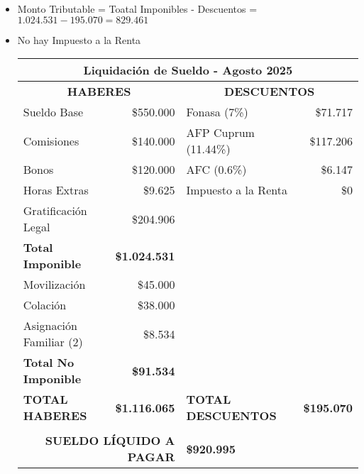\documentclass[11pt]{article}
\begin{document}
\begin{enumerate}
\begin{itemize}
        \item Monto Tributable = Toatal Imponibles - Descuentos = $1.024.531 - 195.070 = 829.461 $
        \item No hay Impuesto a la Renta
            \begin{center}
            \begin{tabular}{|| l | r || l | r ||}
                \hline
                \multicolumn{4}{||c||}{\textbf{Liquidación de Sueldo - Agosto 2025}} \\
                \hline
                \multicolumn{2}{||c||}{\textbf{HABERES}} & \multicolumn{2}{c||}{\textbf{DESCUENTOS}} \\
                \hline
                Sueldo Base & \$550.000 & Fonasa (7\%) & \$71.717 \\
                Comisiones & \$140.000 & AFP Cuprum (11.44\%) & \$117.206 \\
                Bonos & \$120.000 & AFC (0.6\%) & \$6.147 \\
                Horas Extras & \$9.625 & Impuesto a la Renta & \$0 \\
                Gratificación Legal & \$204.906 & & \\
                \hline
                \textbf{Total Imponible} & \textbf{\$1.024.531} & & \\
                \hline
                Movilización & \$45.000 & & \\
                Colación & \$38.000 & & \\
                Asignación Familiar (2) & \$8.534 & & \\
                \hline
                \textbf{Total No Imponible} & \textbf{\$91.534} & & \\
                \hline \hline
                \textbf{TOTAL HABERES} & \textbf{\$1.116.065} & \textbf{TOTAL DESCUENTOS} & \textbf{\$195.070} \\
                \hline
                \multicolumn{4}{||c||}{} \\
                \hline
                \multicolumn{2}{||r|}{\textbf{SUELDO LÍQUIDO A PAGAR}} & \multicolumn{2}{l||}{\textbf{\$920.995}} \\
                \hline
            \end{tabular}
        \end{center}        \end{itemize}
\end{enumerate}
\end{document}
